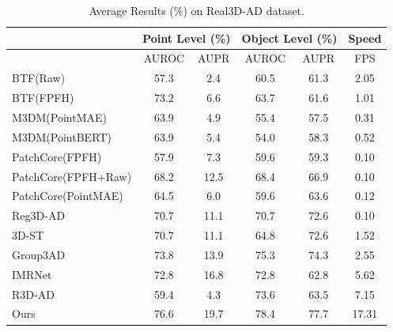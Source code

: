 \begin{table}[ht]
\centering
\caption{Average Results (\%) on Real3D-AD dataset.}
\label{tab:Real3D}
\begin{tabular}{l|cc|cc|c}
\hline
& \multicolumn{2}{c|}{Point Level (\%)} & \multicolumn{2}{c|}{Object Level (\%)} & Speed \\
\hline
& AUROC & AUPR & AUROC & AUPR & FPS \\ 
\hline
BTF(Raw)                            & 57.3 & 2.4 & 60.5 & 61.3  & 2.05 \\
BTF(FPFH)                           & 73.2 & 6.6 & 63.7 & 61.6  & 1.01 \\
M3DM(PointMAE)                      & 63.9 & 4.9 & 55.4 & 57.5  & 0.31 \\
M3DM(PointBERT)                     & 63.9 & 5.4 & 54.0 & 58.3  & 0.52 \\
PatchCore(FPFH)                     & 57.9 & 7.3 & 59.6 & 59.3  & 0.10 \\
PatchCore(FPFH+Raw)                 & 68.2 & 12.5 & 68.4 & 66.9  & 0.10 \\
PatchCore(PointMAE)                 & 64.5 & 6.0 & 59.6 & 63.6  & 0.12 \\
Reg3D-AD \cite{liu2023real3d}       & 70.7 & 11.1 & 70.7 & 72.6  & 0.10 \\
3D-ST \cite{bergmann2023anomaly}    & 70.7 & 11.1 & 64.8 & 72.6  & 1.52 \\
Group3AD   \cite{zhu2024towards}    & 73.8 & 13.9 & 75.3 & 74.3  & 2.55 \\
IMRNet   \cite{li2024towards}       & 72.8 & 16.8 & 72.8 & 62.8  & 5.62 \\
R3D-AD   \cite{zhou2024r3d}         & 59.4 & 4.3 & 73.6 & 63.5  & 7.15 \\
Ours                                & 76.6 & 19.7 & 78.4 & 77.7 & 17.31 \\
\hline
\end{tabular}
\end{table}



